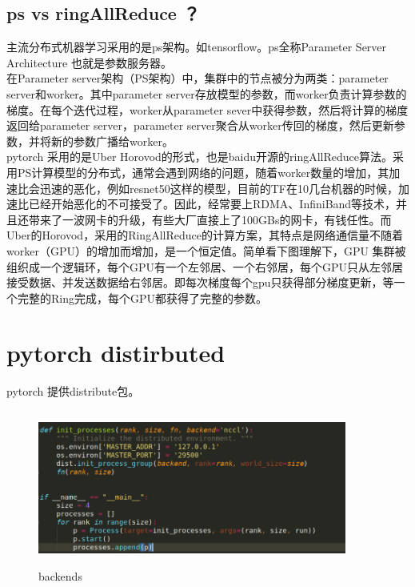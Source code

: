 \documentclass{article}
\begin{document}
\begin{CJK*}{UTF8}{gbsn}
\subsection{ps vs ringAllReduce ？}
主流分布式机器学习采用的是ps架构。如tensorflow。ps全称Parameter Server Architecture 也就是参数服务器。\\
在Parameter server架构（PS架构）中，集群中的节点被分为两类：parameter server和worker。其中parameter server存放模型的参数，而worker负责计算参数的梯度。在每个迭代过程，worker从parameter sever中获得参数，然后将计算的梯度返回给parameter server，parameter server聚合从worker传回的梯度，然后更新参数，并将新的参数广播给worker。\\

pytorch 采用的是Uber Horovod的形式，也是baidu开源的ringAllReduce算法。采用PS计算模型的分布式，通常会遇到网络的问题，随着worker数量的增加，其加速比会迅速的恶化，例如resnet50这样的模型，目前的TF在10几台机器的时候，加速比已经开始恶化的不可接受了。因此，经常要上RDMA、InfiniBand等技术，并且还带来了一波网卡的升级，有些大厂直接上了100GBs的网卡，有钱任性。而Uber的Horovod，采用的RingAllReduce的计算方案，其特点是网络通信量不随着worker（GPU）的增加而增加，是一个恒定值。简单看下图理解下，GPU 集群被组织成一个逻辑环，每个GPU有一个左邻居、一个右邻居，每个GPU只从左邻居接受数据、并发送数据给右邻居。即每次梯度每个gpu只获得部分梯度更新，等一个完整的Ring完成，每个GPU都获得了完整的参数。

\section{pytorch distirbuted}
pytorch 提供distribute包。
\begin{figure}[H]
\centering
\includegraphics[width=4in,height=2in]{torch}
\caption{backends}
\end{figure}

\end{CJK*}
\end{document}

